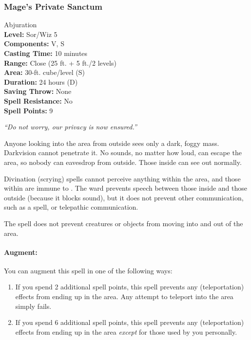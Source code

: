 \subsubsection{Mage's Private Sanctum}
\label{Spell:PrivateSanctum}
Abjuration
\\ \textbf{Level:} Sor/Wiz 5
\\ \textbf{Components:} V, S
\\ \textbf{Casting Time:} 10 minutes
\\ \textbf{Range:} Close (25 ft. + 5 ft./2 levels)
\\ \textbf{Area:} 30-ft. cube/level (S)
\\ \textbf{Duration:} 24 hours (D)
\\ \textbf{Saving Throw:} None
\\ \textbf{Spell Resistance:} No
\\ \textbf{Spell Points:} 9

\emph{``Do not worry, our privacy is now ensured.''}

Anyone looking into the area from outside sees only a dark, foggy mass. 
Darkvision cannot penetrate it. No sounds, no matter how loud, can escape the area, 
so nobody can eavesdrop from outside. Those inside can see out normally.

Divination (scrying) spells cannot perceive anything within the area, 
and those within are immune to . 
The ward prevents speech between those inside and those outside (because it blocks sound), 
but it does not prevent other communication, such as a  spell, 
or telepathic communication.%

The spell does not prevent creatures or objects from moving into and out of the area.

\paragraph{Augment:} You can augment this spell in one of the following ways:
\begin{enumerate}
 \item If you spend 2 additional spell points, this spell prevents any (teleportation)
effects from ending up in the area. Any attempt to teleport into the area simply fails.
 \item If you spend 6 additional spell points, this spell prevents any (teleportation)
effects from ending up in the area \emph{except} for those used by you personally.
\end{enumerate}

